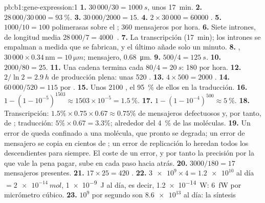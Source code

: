 \begin{solution}{pb:b1:gene-expression:1}
\textbf{1.} $30\,000/30 = \qty{1000}{s}$, unos \qty{17}{min}.
\textbf{2.} $28\,000/30\,000 = \qty{93}{\%}$.
\textbf{3.} $30\,000/2000 = 15$.
\textbf{4.} $2\times 30\,000 = \num{60000}$ .
\textbf{5.} $1000/10 = 100$ polimerasas sobre el ; 360 mensajeros por
hora.
\textbf{6.} Siete intrones, de longitud media $28\,000/7 = \qty{4000}{}$
.
\textbf{7.} La transcripción (\qty{17}{min}); los intrones se empalman a
medida que se fabrican, y el último añade solo un minuto.
\textbf{8.} , $30\,000\times 0.34\,\mathrm{nm} = \qty{10}{\micro m}$; mensajero, \qty{0.68}{\micro m}.
\textbf{9.} $500/4 = \qty{125}{s}$.
\textbf{10.} $2000/80 = 25$.
\textbf{11.} Una cadena termina cada $80/4 = \qty{20}{s}$: 180 por hora.
\textbf{12.} $2/\ln 2 = \qty{2.9}{h}$ de producción plena: unas 520
.
\textbf{13.} $4\times 500 = 2000$ .
\textbf{14.} $60\,000/520 = 115$  por .
\textbf{15.} Unos 2100 , el \qty{95}{\%} de ellos en la traducción.
\textbf{16.} $1 - (1 - 10^{-5})^{1503} \approx 1503\times 10^{-5} =
\qty{1.5}{\%}$.
\textbf{17.} $1 - (1 - 10^{-4})^{500} \approx \qty{5}{\%}$.
\textbf{18.} Transcripción: $1.5\%\times 0.75\times 0.67 \approx
0.75\%$ de mensajeros defectuosos y, por tanto, de ; traducción:
$5\%\times 0.67 = 3.3\%$; alrededor del \qty{4}{\%} de las moléculas.
\textbf{19.} Un error de  queda confinado a una molécula, que pronto
se degrada; un error de mensajero se copia en cientos de ; un error
de replicación lo heredan todos los descendientes para siempre. El coste de
un error, y por tanto la precisión por la que vale la pena pagar, sube en
cada paso hacia atrás.
\textbf{20.} $3000/180 = 17$ mensajeros presentes.
\textbf{21.} $17\times 25 = 420$ .
\textbf{22.} $\num{3e9}\times 4 = \num{1.2e10}$  al día
$= \qty{2e-14}{mol}$, \qty{1e-9}{J} al día, es decir, \qty{1.2e-14}{W}:
\qty{6}{fW} por micrómetro cúbico.
\textbf{23.} $10^9$  por segundo son $\num{8.6e13}$ al día: la síntesis

\end{solution}
